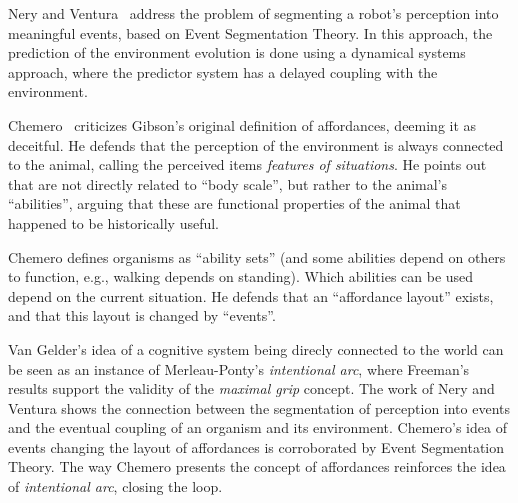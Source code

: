 \documentclass{article}
\begin{document}
Nery and Ventura~\cite{nery2011} address the problem of segmenting a robot's
perception into meaningful events, based on Event Segmentation Theory. In this
approach, the prediction of the environment evolution is done using a dynamical
systems approach, where the predictor system has a delayed coupling with the
environment.


Chemero~\cite{chemero2003} criticizes Gibson's original definition of
affordances, deeming it as deceitful. He defends that the perception of the
environment is always connected to the animal, calling the perceived items
\emph{features of situations}. He points out that are not directly related to
``body scale'', but rather to the animal's ``abilities'', arguing that these are
functional properties of the animal that happened to be historically useful.

Chemero defines organisms as ``ability sets'' (and some abilities depend on
others to function, e.g., walking depends on standing). Which abilities can be
used depend on the current situation. He defends that an ``affordance layout''
exists, and that this layout is changed by ``events''.


Van Gelder's idea of a cognitive system being direcly connected to the world can
be seen as an instance of Merleau-Ponty's \emph{intentional arc}, where
Freeman's results support the validity of the \emph{maximal grip} concept.
The work of Nery and Ventura shows the connection between the segmentation of
perception into events and the eventual coupling of an organism and its
environment. Chemero's idea of events changing the layout of affordances is
corroborated by Event Segmentation Theory. The way Chemero presents the
concept of affordances reinforces the idea of \emph{intentional arc}, closing
the loop.

\end{document}
